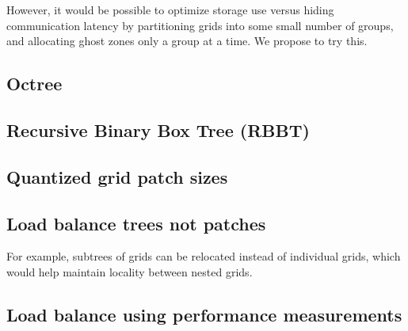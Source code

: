 \documentclass{article}
\begin{document}
  However, it would be possible to optimize storage use versus hiding
  communication latency by partitioning grids into some small number
  of groups, and allocating ghost zones only a group at a time.  We
  propose to try this.

\subsection{Octree} \label{solution:amr-octree}

\vspace{2in}


\subsection{Recursive Binary Box Tree (RBBT)}  \label{solution:amr-boxtree}

\vspace{2in}


\subsection{Quantized grid patch sizes} \label{solution:amr-grid-quantized}

\vspace{2in}


\subsection{Load balance trees not patches} \label{solution:amr-balance-trees}

For example, subtrees of grids can be relocated instead of individual
grids, which would help maintain locality between nested grids.

\subsection{Load balance using performance measurements}  \label{solution:amr-balance-performance}
\end{document}
